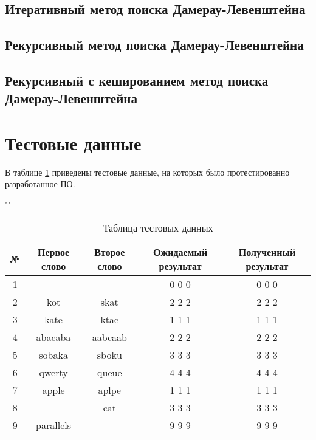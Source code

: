 \subsection{Итеративный метод поиска Дамерау-Левенштейна}


\subsection{Рекурсивный метод поиска Дамерау-Левенштейна}


\subsection{Рекурсивный с кешированием метод поиска Дамерау-Левенштейна}


\section{Тестовые данные}

В таблице \ref{tab:o} приведены тестовые данные, на которых было протестированно разработанное ПО.

\begin{table}[h]
    \begin{center}
        \caption{Таблица тестовых данных}
        \label{tab:o}
        ""\newline
        \begin{tabular}{|c c c c c|}
            \hline
            № & Первое слово & Второе слово & Ожидаемый результат & Полученный результат \\ [0.8ex]
            \hline
            1 &  &  & 0 0 0 & 0 0 0\\
            \hline
            2 & kot & skat & 2 2 2 & 2 2 2\\
            \hline
            3 & kate & ktae & 1 1 1 & 1 1 1\\
            \hline
            4 & abacaba & aabcaab & 2 2 2 & 2 2 2\\
            \hline
            5 & sobaka & sboku & 3 3 3 & 3 3 3\\
            \hline
            6 & qwerty & queue & 4 4 4 & 4 4 4\\
            \hline
            7 & apple & aplpe & 1 1 1  & 1 1 1\\
            \hline
            8 &  & cat & 3 3 3 & 3 3 3\\
            \hline
            9 & parallels &  & 9 9 9 & 9 9 9\\
            \hline
        \end{tabular}
    \end{center}
\end{table}

